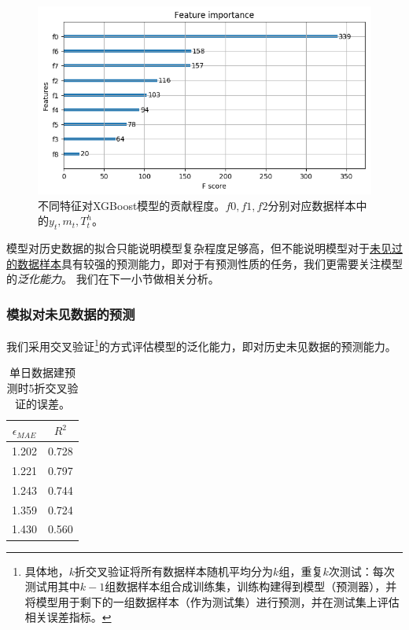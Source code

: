 \begin{figure}
\begin{center}
	\includegraphics[width=0.9\linewidth]{feature_importance}
\caption{不同特征对XGBoost模型的贡献程度。$f0,f1,f2$分别对应数据样本中的$y_t, m_t, T^h_t$。}
\label{fig:feature_importance}
\end{center}
\end{figure}

模型对历史数据的拟合只能说明模型复杂程度足够高，但不能说明模型对于\uline{未见过的数据样本}具有较强的预测能力，即对于有预测性质的任务，我们更需要关注模型的\emph{泛化能力}。
我们在下一小节做相关分析。

\subsubsection{模拟对未见数据的预测}
\label{predict_singleday}

我们采用交叉验证\footnote{具体地，$k$折交叉验证将所有数据样本随机平均分为$k$组，重复$k$次测试：每次测试用其中$k-1$组数据样本组合成训练集，训练构建得到模型（预测器），并将模型用于剩下的一组数据样本（作为测试集）进行预测，并在测试集上评估相关误差指标。}的方式评估模型的泛化能力，即对历史未见数据的预测能力。


\begin{table}
\caption{单日数据建预测时5折交叉验证的误差。}
\begin{center}
\footnotesize
\begin{tabular}{|c|c|}
\hline
	$\epsilon_{MAE}$ & $R^2$ \\
\hline
 1.202 &  0.728\\
 1.221 &  0.797\\
 1.243 &  0.744 \\
 1.359 &  0.724 \\
 1.430 &  0.560 \\
\hline
\end{tabular}
\end{center}
\label{tab:singleday_predict_all}
\end{table}



